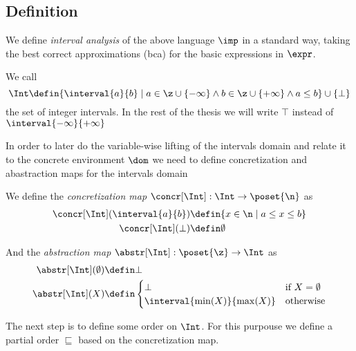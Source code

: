 \subsection{Definition}
\label{sub:intervals}

We define \emph{interval analysis} of the above language \(\imp\) in a
standard way, taking the best correct approximations (bca) for the
basic expressions in \(\expr\).

\begin{definition}
  We call
  \begin{equation*}
    \Int \defin \{ \interval{a}{b} \mid a \in \z \cup \{-\infty\}
    \wedge b \in \z \cup \{+\infty\} \wedge a\leq b \} \cup
    \{\bot\} 
  \end{equation*}
  the set of integer intervals. In the rest of the thesis we will
  write \(\top\) instead of \(\interval{-\infty}{+\infty}\)
\end{definition}

In order to later do the variable-wise lifting of the intervals domain
and relate it to the concrete environment \(\dom\) we need to define
concretization and abastraction maps for the intervals domain

\begin{definition}
  We define the \emph{concretization map} \(\concr[\Int] : \Int \to
  \poset{\n}\) as
  \begin{align*}
    \concr[\Int](\interval{a}{b}) & \defin \{x\in \n \mid a \leq x \leq b\} \\
    \concr[\Int](\bot) & \defin \emptyset
  \end{align*}

  And the \emph{abstraction map} \(\abstr[\Int]:\poset{\z} \to \Int\) as
  \begin{align*}
    \abstr[\Int](\emptyset) & \defin \bot \\
    \abstr[\Int](X) & \defin
    \begin{cases}
      \bot & \text{if } X = \emptyset \\
      \interval{\min(X)}{\max(X)} & \text{otherwise}
    \end{cases}
  \end{align*}
\end{definition}

The next step is to define some order on \(\Int\). For this purpouse
we define a partial order \(\sqsubseteq\) based on the concretization
map.


